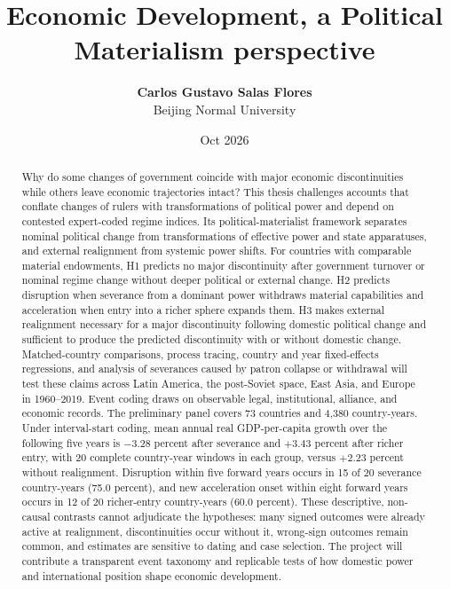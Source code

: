 \documentclass[11pt]{article}
\title{\textbf{Economic Development, a Political Materialism perspective}}
\author{\textbf{Carlos Gustavo Salas Flores} \\ \small Beijing Normal University}
\date{Oct 2026}
\begin{document}
\maketitle

\begin{abstract}
Why do some changes of government coincide with major economic discontinuities while others leave economic trajectories intact? This thesis challenges accounts that conflate changes of rulers with transformations of political power and depend on contested expert-coded regime indices. Its political-materialist framework separates nominal political change from transformations of effective power and state apparatuses, and external realignment from systemic power shifts. For countries with comparable material endowments, H1 predicts no major discontinuity after government turnover or nominal regime change without deeper political or external change. H2 predicts disruption when severance from a dominant power withdraws material capabilities and acceleration when entry into a richer sphere expands them. H3 makes external realignment necessary for a major discontinuity following domestic political change and sufficient to produce the predicted discontinuity with or without domestic change. Matched-country comparisons, process tracing, country and year fixed-effects regressions, and analysis of severances caused by patron collapse or withdrawal will test these claims across Latin America, the post-Soviet space, East Asia, and Europe in 1960--2019. Event coding draws on observable legal, institutional, alliance, and economic records. The preliminary panel covers 73 countries and 4,380 country-years. Under interval-start coding, mean annual real GDP-per-capita growth over the following five years is $-3.28$ percent after severance and $+3.43$ percent after richer entry, with 20 complete country-year windows in each group, versus $+2.23$ percent without realignment. Disruption within five forward years occurs in 15 of 20 severance country-years (75.0 percent), and new acceleration onset within eight forward years occurs in 12 of 20 richer-entry country-years (60.0 percent). These descriptive, non-causal contrasts cannot adjudicate the hypotheses: many signed outcomes were already active at realignment, discontinuities occur without it, wrong-sign outcomes remain common, and estimates are sensitive to dating and case selection. The project will contribute a transparent event taxonomy and replicable tests of how domestic power and international position shape economic development.
\end{abstract}
\end{document}

